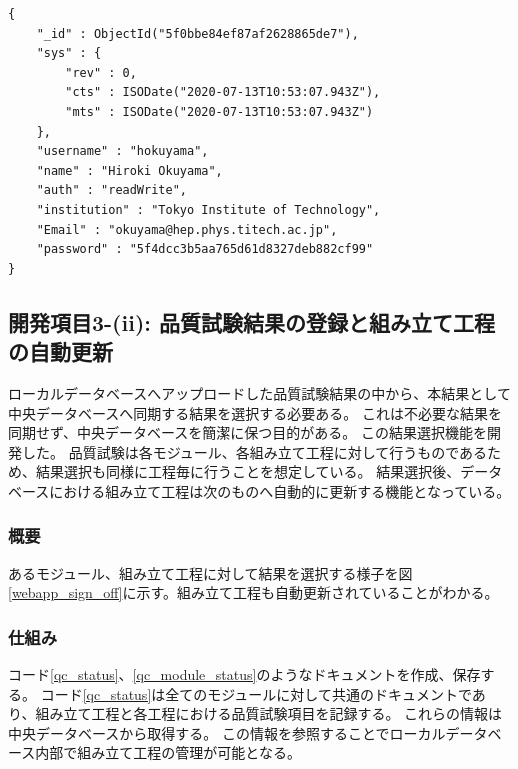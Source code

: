 \begin{lstlisting}[basicstyle=\scriptsize,caption=ウェブアプリケーションで扱うユーザ情報を持つドキュメントの例。リスト\ref{user_doc_1}で示したものとは別に、ウェブアプリケーション内でユーザ情報を扱うためにこのドキュメントを保持する必要がある。ウェブにおいてログインはこのドキュメントの存在確認をもってなされる。パスワードはhash化して保存している。,label=user_doc_2]
{
	"_id" : ObjectId("5f0bbe84ef87af2628865de7"),
	"sys" : {
		"rev" : 0,
		"cts" : ISODate("2020-07-13T10:53:07.943Z"),
		"mts" : ISODate("2020-07-13T10:53:07.943Z")
	},
	"username" : "hokuyama",
	"name" : "Hiroki Okuyama",
	"auth" : "readWrite",
	"institution" : "Tokyo Institute of Technology",
	"Email" : "okuyama@hep.phys.titech.ac.jp",
	"password" : "5f4dcc3b5aa765d61d8327deb882cf99"
}
\end{lstlisting}

\clearpage
\newpage
\subsection{開発項目3-(ii): 品質試験結果の登録と組み立て工程の自動更新}\label{sec:stage_management_function}
ローカルデータベースへアップロードした品質試験結果の中から、本結果として中央データベースへ同期する結果を選択する必要ある。
これは不必要な結果を同期せず、中央データベースを簡潔に保つ目的がある。
この結果選択機能を開発した。
品質試験は各モジュール、各組み立て工程に対して行うものであるため、結果選択も同様に工程毎に行うことを想定している。
結果選択後、データベースにおける組み立て工程は次のものへ自動的に更新する機能となっている。

\subsubsection{概要}
あるモジュール、組み立て工程に対して結果を選択する様子を図\ref{webapp_sign_off}に示す。組み立て工程も自動更新されていることがわかる。

\subsubsection{仕組み}
コード\ref{qc_status}、\ref{qc_module_status}のようなドキュメントを作成、保存する。
コード\ref{qc_status}は全てのモジュールに対して共通のドキュメントであり、組み立て工程と各工程における品質試験項目を記録する。
これらの情報は中央データベースから取得する。
この情報を参照することでローカルデータベース内部で組み立て工程の管理が可能となる。

